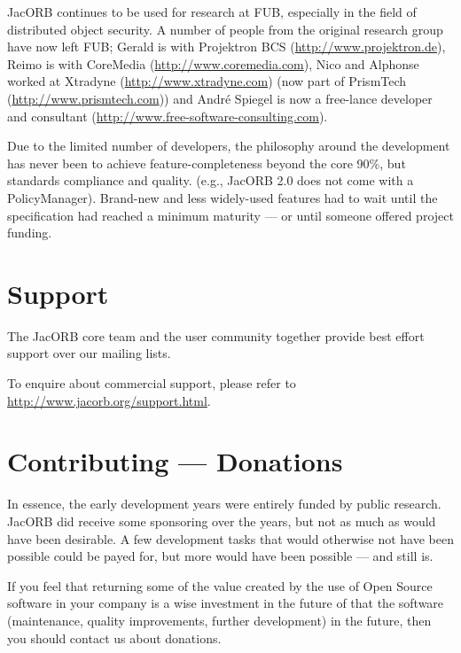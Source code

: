JacORB continues to be used for research at FUB, especially in the
field of distributed object security. A number of people from the original
research group have now left FUB; Gerald is with Projektron BCS
(\href{http://www.projektron.de}{http://www.projektron.de}), Reimo is
with CoreMedia (\href{http://www.coremedia.com}{http://www.coremedia.com}),
Nico and Alphonse worked at Xtradyne (\href{http://www.xtradyne.com}
{http://www.xtradyne.com}) (now part of PrismTech
(\href{http://www.prismtech.com}{http://www.prismtech.com})) and Andr{\'e}
Spiegel is now a free-lance developer and consultant
(\href{http://www.free-software-consulting.com}
{http://www.free-software-consulting.com}).

Due to the limited number of developers, the philosophy around the
development has never been to achieve feature-completeness beyond the
core 90\%, but standards compliance and quality.  (e.g., JacORB 2.0
does not come with a PolicyManager).  Brand-new and less widely-used
features had to wait until the specification had reached a minimum
maturity --- or until someone offered project funding.

\section{Support}

The JacORB core team and the user community together provide best
effort support over our mailing lists.

To enquire about commercial support, please refer to
\href{http://www.jacorb.org/support.html}{http://www.jacorb.org/support.html}.

\section{Contributing --- Donations}

In essence, the early development years were entirely funded by public
research. JacORB did receive some sponsoring over the years, but not
as much as would have been desirable. A few development tasks that
would otherwise not have been possible could be payed for, but more
would have been possible --- and still is.

If you feel that returning some of the value created by the use of
Open Source software in your company is a wise investment in the
future of that the software (maintenance, quality improvements,
further development) in the future, then you should contact us about
donations.

